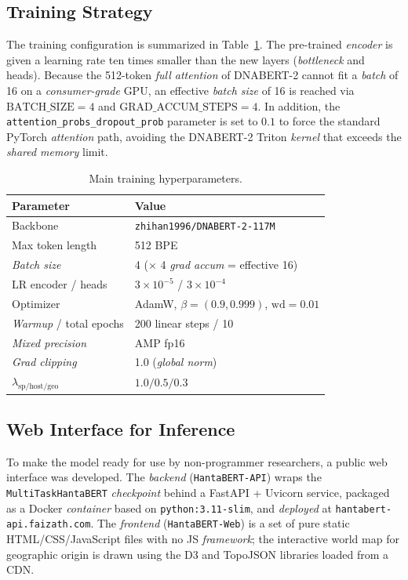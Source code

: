 \documentclass[conference]{IEEEtran}
\begin{document}
\subsection{Training Strategy}

The training configuration is summarized in Table~\ref{tab:hyper}. The
pre-trained \emph{encoder} is given a learning rate ten times smaller than
the new layers (\emph{bottleneck} and heads). Because the 512-token
\emph{full attention} of DNABERT-2 cannot fit a \emph{batch} of 16 on a
\emph{consumer-grade} GPU, an effective \emph{batch size} of 16 is reached
via $\text{BATCH\_SIZE}{=}4$ and $\text{GRAD\_ACCUM\_STEPS}{=}4$. In
addition, the \texttt{attention\_probs\_dropout\_prob} parameter is set to
$0{.}1$ to force the standard PyTorch \emph{attention} path, avoiding the
DNABERT-2 Triton \emph{kernel} that exceeds the \emph{shared memory}
limit.

\begin{table}[t]
\centering
\caption{Main training hyperparameters.}
\label{tab:hyper}
\begin{tabular}{ll}
\toprule
\textbf{Parameter} & \textbf{Value} \\
\midrule
Backbone & \texttt{zhihan1996/DNABERT-2-117M} \\
Max token length & 512 BPE \\
\emph{Batch size} & 4 ($\times$ 4 \emph{grad accum} = effective 16) \\
LR encoder / heads & $3{\times}10^{-5}$ / $3{\times}10^{-4}$ \\
Optimizer & AdamW, $\beta=(0{.}9,0{.}999)$, $\text{wd}=0{.}01$ \\
\emph{Warmup} / total epochs & 200 linear steps / 10 \\
\emph{Mixed precision} & AMP fp16 \\
\emph{Grad clipping} & 1{.}0 (\emph{global norm}) \\
$\lambda_{\text{sp/host/geo}}$ & $1{.}0/0{.}5/0{.}3$ \\
\bottomrule
\end{tabular}
\end{table}

\subsection{Web Interface for Inference}\label{sec:webui}

To make the model ready for use by non-programmer researchers, a public
web interface was developed. The \emph{backend} (\texttt{HantaBERT-API})
wraps the \texttt{MultiTaskHantaBERT} \emph{checkpoint} behind a
FastAPI + Uvicorn service, packaged as a Docker \emph{container} based on
\texttt{python:3.11-slim}, and \emph{deployed} at
\texttt{hantabert-api.faizath.com}. The \emph{frontend}
(\texttt{HantaBERT-Web}) is a set of pure static HTML/CSS/JavaScript files
with no JS \emph{framework}; the interactive world map for geographic
origin is drawn using the D3 and TopoJSON libraries loaded from a CDN.
\end{document}
